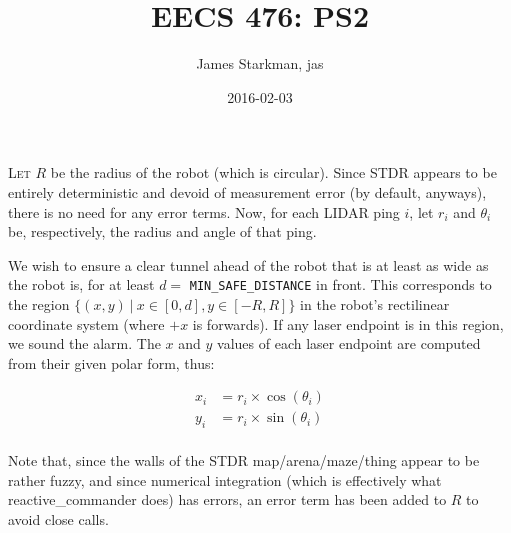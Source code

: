 \documentclass{article}
\begin{document}
\title{EECS 476: PS2}
\author{James Starkman, jas}
\date{2016-02-03}
\maketitle

\lettrine{L}{et} $R$ be the radius of the robot (which is circular).
Since STDR appears to be entirely deterministic and devoid of
measurement error (by default, anyways), there is no need for any
error terms.  Now, for each LIDAR ping $i$, let $r_i$ and $\theta_i$
be, respectively, the radius and angle of that ping.

We wish to ensure a clear tunnel ahead of the robot that is at least
as wide as the robot is, for at least $d=$ \verb|MIN_SAFE_DISTANCE| in
front.  This corresponds to the region
$\{(x,y) \ |\ x\in[0,d], y\in[-R,R]\}$ in the robot's rectilinear
coordinate system (where $+x$ is forwards).  If any laser endpoint is
in this region, we sound the alarm.  The $x$ and $y$ values of each
laser endpoint are computed from their given polar form, thus:

\begin{equation*}
  \begin{array}{rl}
    x_i &= r_i\times\cos(\theta_i) \\
    y_i &= r_i\times\sin(\theta_i) \\
  \end{array}
\end{equation*}

Note that, since the walls of the STDR map/arena/maze/thing appear to
be rather fuzzy, and since numerical integration (which is effectively
what reactive\_commander does) has errors, an error term has been
added to $R$ to avoid close calls.
\end{document}
